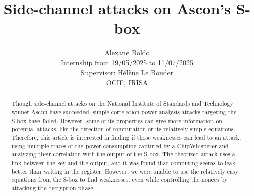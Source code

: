 \documentclass[11pt,technote]{IEEEtran}
\author{
		Alexane Boldo\\
		Internship from 19/05/2025 to 11/07/2025\\
		Supervisor: Hélène Le Bouder\\
		OCIF, IRISA
	}
\title{Side-channel attacks on Ascon's S-box}
\date{}
\begin{document}
		\maketitle
		
		\begin{abstract}
			Though side-channel attacks on the National Institute of Standards and Technology winner Ascon have succeeded, simple correlation power analysis attacks targeting the S-box have failed. However, some of its properties can give more information on potential attacks, like the direction of computation or its relatively simple equations. Therefore, this article is interested in finding if those weaknesses can lead to an attack, using multiple traces of the power consumption captured by a ChipWhisperer and analyzing their correlation with the output of the S-box. The theorized attack uses a link between the key and the output, and it was found that computing seems to leak better than writing in the register. However, we were unable to use the relatively easy equations from the S-box to find weaknesses, even while controlling the nonces by attacking the decryption phase.
		\end{abstract}
		
		
\end{document}
